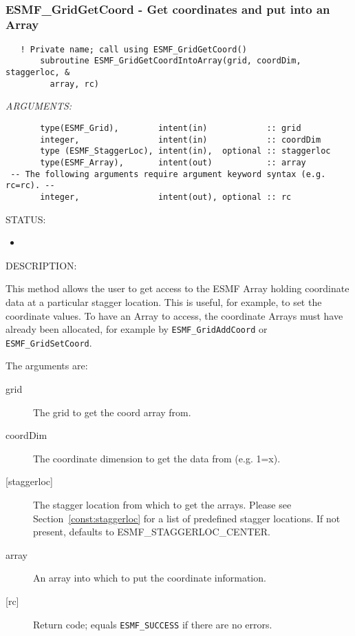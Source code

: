  
\mbox{}\hrulefill\ 
 

  \label{API:GridGetCoordIntoArray}\subsubsection [ESMF\_GridGetCoord] {ESMF\_GridGetCoord - Get coordinates and put into an Array}


 
\begin{verbatim}   ! Private name; call using ESMF_GridGetCoord()
       subroutine ESMF_GridGetCoordIntoArray(grid, coordDim, staggerloc, &
         array, rc)\end{verbatim}{\em ARGUMENTS:}
\begin{verbatim}       type(ESMF_Grid),        intent(in)            :: grid
       integer,                intent(in)            :: coordDim
       type (ESMF_StaggerLoc), intent(in),  optional :: staggerloc
       type(ESMF_Array),       intent(out)           :: array
 -- The following arguments require argument keyword syntax (e.g. rc=rc). --
       integer,                intent(out), optional :: rc\end{verbatim}
{\sf STATUS:}
   \begin{itemize}
   \item{}
   \end{itemize}
  
{\sf DESCRIPTION:\\ }


      This method allows the user to get access to the ESMF Array holding
      coordinate data at a particular stagger location. This is useful, for example,
      to set the coordinate values. To have an Array to access, the coordinate Arrays
      must have already been allocated, for example by {\tt ESMF\_GridAddCoord} or
      {\tt ESMF\_GridSetCoord}.
  
       The arguments are:
       \begin{description}
       \item[grid]
            The grid to get the coord array from.
       \item[coordDim]
            The coordinate dimension to get the data from (e.g. 1=x).
       \item[{[staggerloc]}]
            The stagger location from which to get the arrays.
            Please see Section~\ref{const:staggerloc} for a list
            of predefined stagger locations. If not present, defaults to ESMF\_STAGGERLOC\_CENTER.
       \item[array]
            An array into which to put the coordinate information.
       \item[{[rc]}]
            Return code; equals {\tt ESMF\_SUCCESS} if there are no errors.
     \end{description}
   

